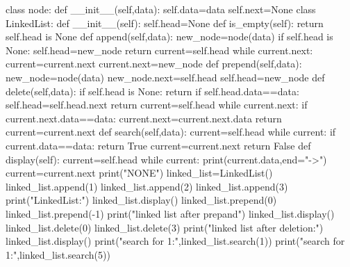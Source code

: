 
class node:
    def __init__(self,data):
        self.data=data
        self.next=None
class LinkedList:
    def __init__(self):
        self.head=None
    def is_empty(self):
        return self.head is None
    def append(self,data):
        new_node=node(data)
        if self.head is None:
            self.head=new_node
            return
        current=self.head
        while current.next:
            current=current.next
        current.next=new_node
    def prepend(self,data):
        new_node=node(data)
        new_node.next=self.head
        self.head=new_node
    def delete(self,data):
        if self.head is None:
            return
        if self.head.data==data:
            self.head=self.head.next
            return
        current=self.head
        while current.next:
            if current.next.data==data:
                current.next=current.next.data
                return
            current=current.next
    def search(self,data):
        current=self.head
        while current:
            if current.data==data:
                return True
            current=current.next
        return False
    def display(self):
        current=self.head
        while current:
            print(current.data,end="->")
            current=current.next
        print("NONE")
linked_list=LinkedList()
linked_list.append(1)
linked_list.append(2)
linked_list.append(3)
print("LinkedList:")
linked_list.display()
linked_list.prepend(0)
linked_list.prepend(-1)
print("linked list after prepand")
linked_list.display()
linked_list.delete(0)
linked_list.delete(3)
print("linked list after deletion:")
linked_list.display()
print("search for 1:",linked_list.search(1))
print("search for 1:",linked_list.search(5))
